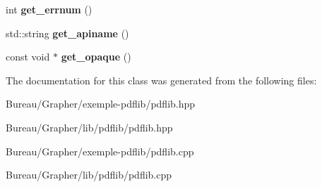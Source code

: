 \begin{DoxyCompactItemize}
\item 
\hypertarget{classPDFlib_1_1Exception_aa29ae977a69d26d5a6aea1da399ff599}{int {\bfseries get\-\_\-errnum} ()}\label{classPDFlib_1_1Exception_aa29ae977a69d26d5a6aea1da399ff599}

\item 
\hypertarget{classPDFlib_1_1Exception_af3a0f58c4912d910f77ce6d6b73ac566}{std\-::string {\bfseries get\-\_\-apiname} ()}\label{classPDFlib_1_1Exception_af3a0f58c4912d910f77ce6d6b73ac566}

\item 
\hypertarget{classPDFlib_1_1Exception_a27805df0fdb2da0f954e3c2588baebd5}{const void $\ast$ {\bfseries get\-\_\-opaque} ()}\label{classPDFlib_1_1Exception_a27805df0fdb2da0f954e3c2588baebd5}

\end{DoxyCompactItemize}


\-The documentation for this class was generated from the following files\-:\begin{DoxyCompactItemize}
\item 
\-Bureau/\-Grapher/exemple-\/pdflib/pdflib.\-hpp\item 
\-Bureau/\-Grapher/lib/pdflib/pdflib.\-hpp\item 
\-Bureau/\-Grapher/exemple-\/pdflib/pdflib.\-cpp\item 
\-Bureau/\-Grapher/lib/pdflib/pdflib.\-cpp\end{DoxyCompactItemize}
